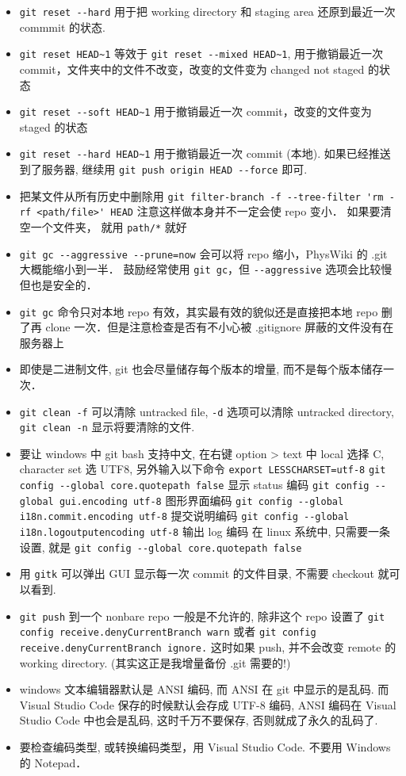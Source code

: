 \begin{itemize}
\item \verb|git reset --hard| 用于把 working directory 和 staging area 还原到最近一次 commmit 的状态.
\item \verb|git reset HEAD~1| 等效于 \verb|git reset --mixed HEAD~1|, 用于撤销最近一次 commit，文件夹中的文件不改变，改变的文件变为 changed not staged 的状态
\item \verb|git reset --soft HEAD~1| 用于撤销最近一次 commit，改变的文件变为 staged 的状态
\item \verb|git reset --hard HEAD~1| 用于撤销最近一次 commit (本地). 如果已经推送到了服务器, 继续用 \verb|git push origin HEAD --force| 即可.
\item 把某文件从所有历史中删除用 \verb|git filter-branch -f --tree-filter 'rm -rf <path/file>' HEAD| 注意这样做本身并不一定会使 repo 变小． 如果要清空一个文件夹， 就用 \verb|path/*| 就好
\item \verb|git gc --aggressive --prune=now| 会可以将 repo 缩小，PhysWiki 的 .git 大概能缩小到一半． 鼓励经常使用 \verb|git gc|，但 \verb|--aggressive| 选项会比较慢但也是安全的．
\item \verb|git gc| 命令只对本地 repo 有效，其实最有效的貌似还是直接把本地 repo 删了再 clone 一次．但是注意检查是否有不小心被 .gitignore 屏蔽的文件没有在服务器上
\item 即使是二进制文件, git 也会尽量储存每个版本的增量, 而不是每个版本储存一次．
\item \verb|git clean -f| 可以清除 untracked file, \verb|-d| 选项可以清除 untracked directory,  \verb|git clean -n| 显示将要清除的文件.
\item 要让 windows 中 git bash 支持中文, 在右键 option > text 中 local 选择 C, character set 选 UTF8, 另外输入以下命令
\verb|export LESSCHARSET=utf-8|
\verb|git config --global core.quotepath false|     显示 status 编码
\verb|git config --global gui.encoding utf-8|    图形界面编码
\verb|git config --global i18n.commit.encoding utf-8|   提交说明编码
\verb|git config --global i18n.logoutputencoding utf-8| 输出 log 编码
在 linux 系统中, 只需要一条设置, 就是
\verb|git config --global core.quotepath false|
\item 用 \verb|gitk| 可以弹出 GUI 显示每一次 commit 的文件目录, 不需要 checkout 就可以看到.
\item \verb|git push| 到一个 nonbare repo 一般是不允许的, 除非这个 repo 设置了 \verb|git config receive.denyCurrentBranch warn| 或者 \verb|git config receive.denyCurrentBranch ignore.| 这时如果 push, 并不会改变 remote 的 working directory. (其实这正是我增量备份 .git 需要的!)
\item windows 文本编辑器默认是 ANSI 编码, 而 ANSI 在 git 中显示的是乱码. 而 Visual Studio Code 保存的时候默认会存成 UTF-8 编码, ANSI 编码在 Visual Studio Code 中也会是乱码, 这时千万不要保存, 否则就成了永久的乱码了.
\item 要检查编码类型, 或转换编码类型，用 Visual Studio Code.  不要用 Windows 的 Notepad．
\end{itemize}
